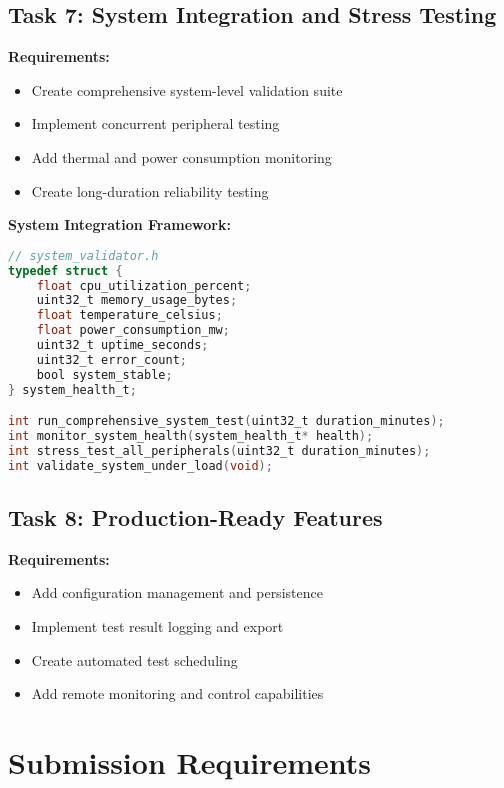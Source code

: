 \documentclass[11pt,a4paper]{article}
\begin{document}
\subsection{Task 7: System Integration and Stress Testing}

\textbf{Requirements:}
\begin{itemize}
    \item Create comprehensive system-level validation suite
    \item Implement concurrent peripheral testing
    \item Add thermal and power consumption monitoring
    \item Create long-duration reliability testing
\end{itemize}

\textbf{System Integration Framework:}
\begin{lstlisting}[language=C]
// system_validator.h
typedef struct {
    float cpu_utilization_percent;
    uint32_t memory_usage_bytes;
    float temperature_celsius;
    float power_consumption_mw;
    uint32_t uptime_seconds;
    uint32_t error_count;
    bool system_stable;
} system_health_t;

int run_comprehensive_system_test(uint32_t duration_minutes);
int monitor_system_health(system_health_t* health);
int stress_test_all_peripherals(uint32_t duration_minutes);
int validate_system_under_load(void);
\end{lstlisting}

\subsection{Task 8: Production-Ready Features}

\textbf{Requirements:}
\begin{itemize}
    \item Add configuration management and persistence
    \item Implement test result logging and export
    \item Create automated test scheduling
    \item Add remote monitoring and control capabilities
\end{itemize}

\section{Submission Requirements}
\end{document}
